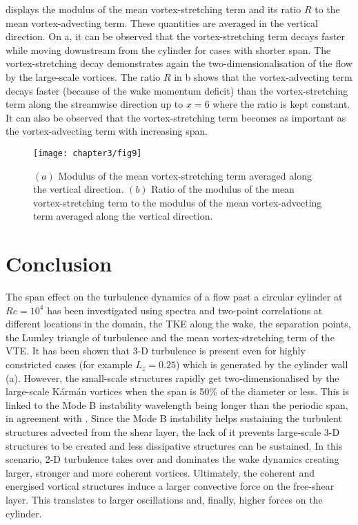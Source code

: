 \documentclass[../main.tex]{subfiles}
\begin{document}
 displays the modulus of the mean vortex-stretching term and its ratio $R$ to the mean vortex-advecting term.
These quantities are averaged in the vertical direction.
On a, it can be observed that the vortex-stretching term decays faster while moving downstream from the cylinder for cases with shorter span.
The vortex-stretching decay demonstrates again the two-dimensionalisation of the flow by the large-scale vortices.
The ratio $R$ in b shows that the vortex-advecting term decays faster (because of the wake momentum deficit) than the vortex-stretching term along the streamwise direction up to $x=6$ where the ratio is kept constant.
It can also be observed that the vortex-stretching term becomes as important as the vortex-advecting term with increasing span.
\begin{figure}
	\vspace*{0.3cm}
  \centerline{\texttt{[image: chapter3/fig9]}}
  \caption{$(a)$ Modulus of the mean vortex-stretching term averaged along the vertical direction.
$(b)$ Ratio of the modulus of the mean vortex-stretching term to the modulus of the mean vortex-advecting term averaged along the vertical direction.}
\label{fig:vortex_stretching}
\end{figure}

\section{Conclusion}\label{Conclusion}

The span effect on the turbulence dynamics of a flow past a circular cylinder at $Re=10^4$ has been investigated using spectra  and two-point correlations at different locations in the domain, the TKE along the wake, the separation points, the Lumley triangle of turbulence and the mean vortex-stretching term of the VTE.
It has been shown that 3-D turbulence is present even for highly constricted cases (for example $L_z=0.25$) which is generated by the cylinder wall (a).
However, the small-scale structures rapidly get two-dimensionalised by the large-scale K\'{a}rm\'{a}n vortices when the span is 50\% of the diameter or less.
This is linked to the Mode B instability wavelength being longer than the periodic span, in agreement with \cite{Bao2016}.
Since the Mode B instability helps sustaining the turbulent structures advected from the shear layer, the lack of it prevents large-scale 3-D structures to be created and less dissipative structures can be sustained.
In this scenario, 2-D turbulence takes over and dominates the wake dynamics creating larger, stronger and more coherent vortices.
Ultimately, the coherent and energised vortical structures induce a larger convective force on the free-shear layer.
This translates to larger oscillations and, finally, higher forces on the cylinder.
\end{document}
